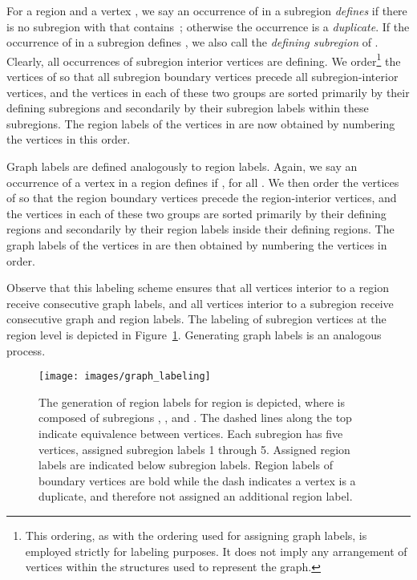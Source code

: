 For a region  and a vertex , we say an occurrence of
 in a subregion  \emph{defines}  if there is no
subregion  with  that contains~; otherwise the
occurrence is a \emph{duplicate}.
If the occurrence of  in a subregion  defines , we also call
 the \emph{defining subregion} of .
Clearly, all occurrences of subregion interior vertices are
defining.
We order\footnote{This ordering, as with the ordering used for assigning 
graph labels, is employed strictly for labeling purposes. It does not imply
any arrangement of vertices within the structures used to represent the graph.}
the vertices of  so that all subregion boundary vertices
precede all subregion-interior vertices, and the vertices in each of these two
groups are sorted primarily by their defining subregions and secondarily by
their subregion labels within these subregions.
The region labels of the vertices in  are now obtained by numbering the
vertices in this order.


Graph labels are defined analogously to region labels.
Again, we say an occurrence of a vertex  in a region  defines
 if , for all .
We then order the vertices of  so that the region boundary vertices precede
the region-interior vertices, and the vertices in each of these two groups are
sorted primarily by their defining regions and secondarily by their region
labels inside their defining regions.
The graph labels of the vertices in  are
then obtained by numbering the vertices in order.

Observe that this labeling scheme ensures that all vertices interior
to a region  receive consecutive graph labels, and all vertices
interior to a subregion  receive consecutive graph and
region labels.
The labeling of subregion vertices at the region level is depicted in 
Figure~\ref{fig:region_labeling}.
Generating graph labels is an analogous process.

\begin{figure}[t]
  \centering
  \texttt{[image: images/graph\_labeling]}
  \caption[Assigning region labels]{
    The generation of region labels for region  is depicted,
    where  is composed of subregions , ,
    and .
    The dashed lines along the top indicate equivalence between vertices.
    Each subregion has five vertices, assigned subregion labels 1 through
    5.
    Assigned region labels are indicated below subregion labels. 
    Region labels of boundary vertices are bold while the dash indicates
    a vertex is a duplicate, and therefore not assigned an additional
    region label.
  }
  \label{fig:region_labeling}
\end{figure}


